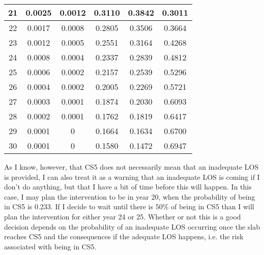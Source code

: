 \begin{table}
\begin{tabular}{|l|l|l|l|l|l|}
\hline
\multicolumn{1}{|c|}{21} & \multicolumn{1}{c|}{0.0025} & \multicolumn{1}{c|}{0.0012} & \multicolumn{1}{c|}{0.3110} & \multicolumn{1}{c|}{0.3842} & \multicolumn{1}{c|}{0.3011} \\ 
\hline
\multicolumn{1}{|c|}{22} & \multicolumn{1}{c|}{0.0017} & \multicolumn{1}{c|}{0.0008} & \multicolumn{1}{c|}{0.2805} & \multicolumn{1}{c|}{0.3506} & \multicolumn{1}{c|}{0.3664} \\ 
\hline
\multicolumn{1}{|c|}{23} & \multicolumn{1}{c|}{0.0012} & \multicolumn{1}{c|}{0.0005} & \multicolumn{1}{c|}{0.2551} & \multicolumn{1}{c|}{0.3164} & \multicolumn{1}{c|}{0.4268} \\ 
\hline
\multicolumn{1}{|c|}{24} & \multicolumn{1}{c|}{0.0008} & \multicolumn{1}{c|}{0.0004} & \multicolumn{1}{c|}{0.2337} & \multicolumn{1}{c|}{0.2839} & \multicolumn{1}{c|}{0.4812} \\ 
\hline
\multicolumn{1}{|c|}{25} & \multicolumn{1}{c|}{0.0006} & \multicolumn{1}{c|}{0.0002} & \multicolumn{1}{c|}{0.2157} & \multicolumn{1}{c|}{0.2539} & \multicolumn{1}{c|}{0.5296} \\ 
\hline
\multicolumn{1}{|c|}{26} & \multicolumn{1}{c|}{0.0004} & \multicolumn{1}{c|}{0.0002} & \multicolumn{1}{c|}{0.2005} & \multicolumn{1}{c|}{0.2269} & \multicolumn{1}{c|}{0.5721} \\ 
\hline
\multicolumn{1}{|c|}{27} & \multicolumn{1}{c|}{0.0003} & \multicolumn{1}{c|}{0.0001} & \multicolumn{1}{c|}{0.1874} & \multicolumn{1}{c|}{0.2030} & \multicolumn{1}{c|}{0.6093} \\ 
\hline
\multicolumn{1}{|c|}{28} & \multicolumn{1}{c|}{0.0002} & \multicolumn{1}{c|}{0.0001} & \multicolumn{1}{c|}{0.1762} & \multicolumn{1}{c|}{0.1819} & \multicolumn{1}{c|}{0.6417} \\ 
\hline
\multicolumn{1}{|c|}{29} & \multicolumn{1}{c|}{0.0001} & \multicolumn{1}{c|}{0} & \multicolumn{1}{c|}{0.1664} & \multicolumn{1}{c|}{0.1634} & \multicolumn{1}{c|}{0.6700} \\ 
\hline
\multicolumn{1}{|c|}{30} & \multicolumn{1}{c|}{0.0001} & \multicolumn{1}{c|}{0} & \multicolumn{1}{c|}{0.1580} & \multicolumn{1}{c|}{0.1472} & \multicolumn{1}{c|}{0.6947} \\ 
\hline
\end{tabular}
\end{table}
As I know, however, that CS5 does not necessarily mean that an inadequate LOS is provided, I can also treat it as a warning that an inadequate LOS is coming if I don't do anything, but that I have a bit of time before this will happen. In this case, I may plan the intervention to be in year 20, when the probability of being in CS5 is 0.233. If I decide to wait until there is 50\% of being in CS5 than I will plan the intervention for either year 24 or 25. Whether or not this is a good decision depends on the probability of an inadequate LOS occurring once the slab reaches CS5 and the consequences if the adequate LOS happens, i.e. the risk associated with being in CS5.

